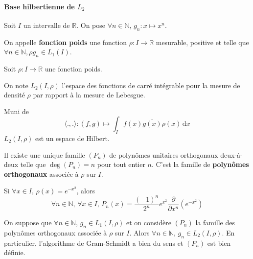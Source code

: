 	\paragraph{Base hilbertienne de \texorpdfstring{$L_2$}{L₂}}


	Soit $I$ un intervalle de $\mathbb{R}$. On pose $\forall n \in \mathbb{N}$, $g_n : x \mapsto x^n$.

	\begin{definition}
		On appelle \textbf{fonction poids} une fonction $\rho : I \rightarrow \mathbb{R}$ mesurable, positive et telle que $\forall n \in \mathbb{N}, \rho g_n \in L_1(I)$.
	\end{definition}

	Soit $\rho : I \rightarrow \mathbb{R}$ une fonction poids.

	\begin{notation}
		On note $L_2(I, \rho)$ l'espace des fonctions de carré intégrable pour la mesure de densité $\rho$ par rapport à la mesure de Lebesgue.
	\end{notation}

	\begin{proposition}
		Muni de
		\[ \langle ., . \rangle : (f,g) \mapsto \int_I f(x) \overline{g(x)} \rho(x) \, \mathrm{d}x \]
		$L_2(I, \rho)$ est un espace de Hilbert.
	\end{proposition}

	\begin{theorem}
		Il existe une unique famille $(P_n)$ de polynômes unitaires orthogonaux deux-à-deux telle que $\deg(P_n) = n$ pour tout entier $n$. C'est la famille de \textbf{polynômes orthogonaux} associée à $\rho$ sur $I$.
	\end{theorem}

	\begin{example}
		Si $\forall x \in I, \, \rho(x) = e^{-x^2}$, alors
		\[ \forall n \in \mathbb{N}, \, \forall x \in I, \, P_n(x) = \frac{(-1)^n}{2^n} e^{x^2} \frac{\partial}{\partial x^n} \left( e^{-x^2} \right) \]
	\end{example}


	\begin{lemma}
		On suppose que $\forall n \in \mathbb{N}$, $g_n \in L_1(I, \rho)$ et on considère $(P_n)$ la famille des polynômes orthogonaux associée à $\rho$ sur $I$. Alors $\forall n \in \mathbb{N}$, $g_n \in L_2(I, \rho)$. En particulier, l'algorithme de Gram-Schmidt a bien du sens et $(P_n)$ est bien définie.
	\end{lemma}

